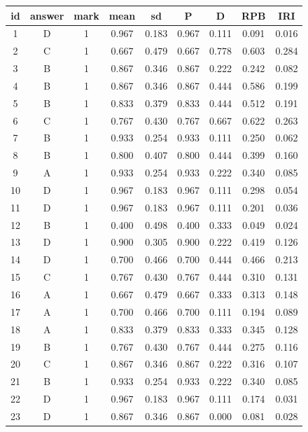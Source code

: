 \documentclass[hyperref,adobefonts]{ctexart}
\begin{document}
\begin{longtable}{c|c|c|c|c|c|c|c|c}
\hline
id & answer & mark & mean & sd & P & D & RPB & IRI\\
\hline
1 & D & 1 & 0.967 & 0.183 & 0.967 & 0.111 & 0.091 & 0.016\\
\hline
2 & C & 1 & 0.667 & 0.479 & 0.667 & 0.778 & 0.603 & 0.284\\
\hline
3 & B & 1 & 0.867 & 0.346 & 0.867 & 0.222 & 0.242 & 0.082\\
\hline
4 & B & 1 & 0.867 & 0.346 & 0.867 & 0.444 & 0.586 & 0.199\\
\hline
5 & B & 1 & 0.833 & 0.379 & 0.833 & 0.444 & 0.512 & 0.191\\
\hline
6 & C & 1 & 0.767 & 0.430 & 0.767 & 0.667 & 0.622 & 0.263\\
\hline
7 & B & 1 & 0.933 & 0.254 & 0.933 & 0.111 & 0.250 & 0.062\\
\hline
8 & B & 1 & 0.800 & 0.407 & 0.800 & 0.444 & 0.399 & 0.160\\
\hline
9 & A & 1 & 0.933 & 0.254 & 0.933 & 0.222 & 0.340 & 0.085\\
\hline
10 & D & 1 & 0.967 & 0.183 & 0.967 & 0.111 & 0.298 & 0.054\\
\hline
11 & D & 1 & 0.967 & 0.183 & 0.967 & 0.111 & 0.201 & 0.036\\
\hline
12 & B & 1 & 0.400 & 0.498 & 0.400 & 0.333 & 0.049 & 0.024\\
\hline
13 & D & 1 & 0.900 & 0.305 & 0.900 & 0.222 & 0.419 & 0.126\\
\hline
14 & D & 1 & 0.700 & 0.466 & 0.700 & 0.444 & 0.466 & 0.213\\
\hline
15 & C & 1 & 0.767 & 0.430 & 0.767 & 0.444 & 0.310 & 0.131\\
\hline
16 & A & 1 & 0.667 & 0.479 & 0.667 & 0.333 & 0.313 & 0.148\\
\hline
17 & A & 1 & 0.700 & 0.466 & 0.700 & 0.111 & 0.194 & 0.089\\
\hline
18 & A & 1 & 0.833 & 0.379 & 0.833 & 0.333 & 0.345 & 0.128\\
\hline
19 & B & 1 & 0.767 & 0.430 & 0.767 & 0.444 & 0.275 & 0.116\\
\hline
20 & C & 1 & 0.867 & 0.346 & 0.867 & 0.222 & 0.316 & 0.107\\
\hline
21 & B & 1 & 0.933 & 0.254 & 0.933 & 0.222 & 0.340 & 0.085\\
\hline
22 & D & 1 & 0.967 & 0.183 & 0.967 & 0.111 & 0.174 & 0.031\\
\hline
23 & D & 1 & 0.867 & 0.346 & 0.867 & 0.000 & 0.081 & 0.028\\

\end{longtable}
\end{document}
